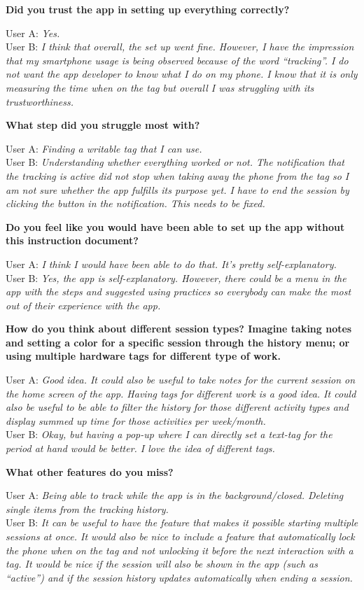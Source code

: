 \documentclass[conference]{IEEEtran}
\newcommand{\surveyquestion}[3]{%
	\noindent\textbf{#1}
	
	\noindent User A: \textit{#2}\\
	User B: \textit{#3}
}
\begin{document}
\surveyquestion{Did you trust the app in setting up everything correctly?}{
	Yes.
}{
	I think that overall, the set up went fine. However, I have the impression that my smartphone usage is being observed because of the word “tracking”. I do not want the app developer to know what I do on my phone. I know that it is only measuring the time when on the tag but overall I was struggling with its trustworthiness.
}

\surveyquestion{What step did you struggle most with?}{
	Finding a writable tag that I can use.
}{
	Understanding whether everything worked or not. The notification that the tracking is active did not stop when taking away the phone from the tag so I am not sure whether the app fulfills its purpose yet. I have to end the session by clicking the button in the notification. This needs to be fixed.
}

\surveyquestion{Do you feel like you would have been able to set up the app without this instruction document?}{
	I think I would have been able to do that. It's pretty self-explanatory.
}{
	Yes, the app is self-explanatory. However, there could be a menu in the app with the steps and suggested using practices so everybody can make the most out of their experience with the app.
}

\surveyquestion{How do you think about different session types? Imagine taking notes and setting a color for a specific session through the history menu; or using multiple hardware tags for different type of work.}{
	Good idea. It could also be useful to take notes for the current session on the home screen of the app. Having tags for different work is a good idea. It could also be useful to be able to filter the history for those different activity types and display summed up time for those activities per week/month.
}{
	Okay, but having a pop-up where I can directly set a text-tag for the period at hand would be better. I love the idea of different tags.
}

\surveyquestion{What other features do you miss?}{
	Being able to track while the app is in the background/closed. Deleting single items from the tracking history.
}{
	It can be useful to have the feature that makes it possible starting multiple sessions at once. It would also be nice to include a feature that automatically lock the phone when on the tag and not unlocking it before the next interaction with a tag. It would be nice if the session will also be shown in the app (such as “active”) and if the session history updates automatically when ending a session.
}
\end{document}
